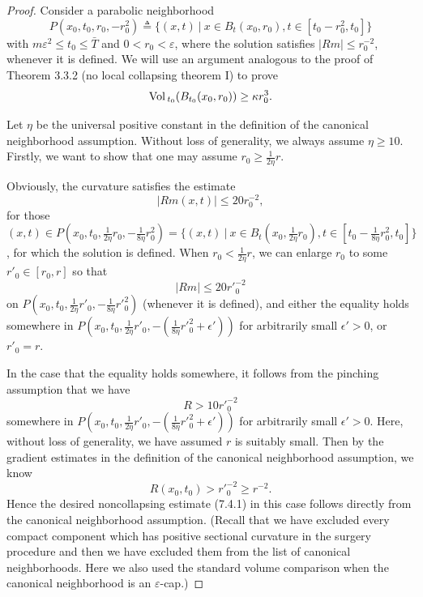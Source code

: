 \begin{proof}
Consider a parabolic neighborhood
$$
P(x_0,t_0,r_0,-r^2_0)\triangleq\{(x,t)\ |\ x\in
B_t(x_0,r_0),t\in[t_0-r^2_0,t_0]\}
$$
with $m\varepsilon^2\leq t_0\leq \bar{T}$ and $0<r_0<\varepsilon$,
where the solution satisfies $|Rm|\leq r^{-2}_0$, whenever it is
defined. We will use an argument analogous to the proof of Theorem
3.3.2 (no local collapsing theorem I) to prove \begin{equation}
\Vol_{t_0}(B_{t_0}(x_0,r_0)) \geq \kappa
r^3_0. %
\end{equation}

Let $\eta$ be the universal positive constant in the definition of
the canonical neighborhood assumption. Without loss of generality,
we always assume $\eta \geq 10$. Firstly, we want to show that one
may assume $r_0 \geq \frac{1}{2\eta}r$.

Obviously, the curvature satisfies the estimate
$$
|Rm(x,t)|\leq 20r^{-2}_0,
$$
for those $(x,t) \in
P(x_0,t_0,\frac{1}{2\eta}r_0,-\frac{1}{8\eta}r^2_0) = \{(x,t)\ |\
x\in
B_t(x_0,\frac{1}{2\eta}r_0),t\in[t_0-\frac{1}{8\eta}r^2_0,t_0]\}$,
for which the solution is defined. When $r_0< \frac{1}{2\eta}r$,
we can enlarge $r_0$ to some $r'_0\in[r_0,r]$ so that
$$
|Rm|\leq 20r'^{-2}_0
$$
on $P(x_0,t_0,\frac{1}{2\eta}r'_0,-\frac{1}{8\eta}r'^2_0)$
(whenever it is defined), and either the equality holds somewhere
in $P(x_0,t_0,\frac
{1}{2\eta}r'_0,-(\frac{1}{8\eta}{r'}^2_0+\epsilon'))$ for
arbitrarily small $\epsilon'>0$, or $r'_0=r$.

In the case that the equality holds somewhere, it follows from the
pinching assumption that we have
$$
R > 10r'^{-2}_0
$$
somewhere in $P(x_0,t_0,\frac{1}{2\eta}r'_0,-(\frac{1}{8\eta}{r'}
^2_0+\epsilon'))$ for arbitrarily small $\epsilon'>0$. Here,
without loss of generality, we have assumed $r$ is suitably small.
Then by the gradient estimates in the definition of the canonical
neighborhood assumption, we know $$R(x_0,t_0) > r'^{-2}_0 \geq
r^{-2}.$$ Hence the desired noncollapsing estimate (7.4.1) in this
case follows directly from the canonical neighborhood assumption.
(Recall that we have excluded every compact component which has
positive sectional curvature in the surgery procedure and then we
have excluded them from the list of canonical neighborhoods. Here
we also used the standard volume comparison when the canonical
neighborhood is an $\varepsilon$-cap.)


\end{proof}
